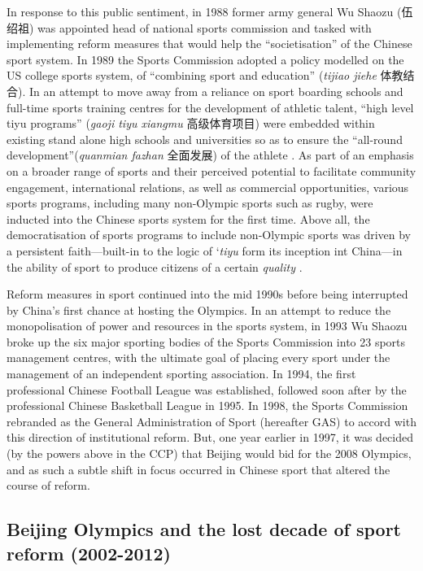 {In response to this public sentiment, in 1988 former army general Wu Shaozu (伍绍祖) was appointed head of national sports commission and tasked with implementing reform measures that would help the ``societisation'' of the Chinese sport system.  In 1989 the Sports Commission adopted a policy modelled on the US college sports system, of ``combining sport and education'' (\textit{tijiao jiehe} 体教结合).  In an attempt to move away from a reliance on sport boarding schools and full-time sports training centres for the development of athletic talent, ``high level tiyu programs'' (\textit{gaoji tiyu xiangmu} 高级体育项目) were embedded within existing stand alone high schools and universities so as to ensure the ``all-round development''(\textit{quanmian fazhan} 全面发展) of the athlete \citep[203]{Brownell1995}.  As part of an emphasis on a broader range of sports and their perceived potential to facilitate community engagement, international relations, as well as commercial opportunities, various sports programs, including many non-Olympic sports such as rugby, were inducted into the Chinese sports system for the first time\citep[70]{Knuttgen1990}.  Above all, the  democratisation of sports programs to include non-Olympic sports was driven by a persistent faith---built-in to the logic of `\textit{tiyu} form its inception int China---in the ability of sport to produce citizens of a certain \textit{quality} \citep[7]{Woronov2003}.

Reform measures in sport continued into the mid 1990s before being interrupted by China's first chance at hosting the Olympics.  In an attempt to reduce the monopolisation of power and resources in the sports system, in 1993 Wu Shaozu broke up the six major sporting bodies of the Sports Commission into 23 sports management centres, with the ultimate goal of placing every sport under the management of an independent sporting association.  In 1994, the first professional Chinese Football League was established, followed soon after by the professional Chinese Basketball League in 1995.  In 1998, the Sports Commission rebranded as the General Administration of Sport (hereafter GAS) to accord with this direction of institutional reform.  But, one year earlier in 1997, it was decided (by the powers above in the CCP) that Beijing would bid for the 2008 Olympics, and as such a subtle shift in focus occurred in Chinese sport that altered the course of reform.


\subsection{Beijing Olympics and the lost decade of sport reform (2002-2012)}

}
